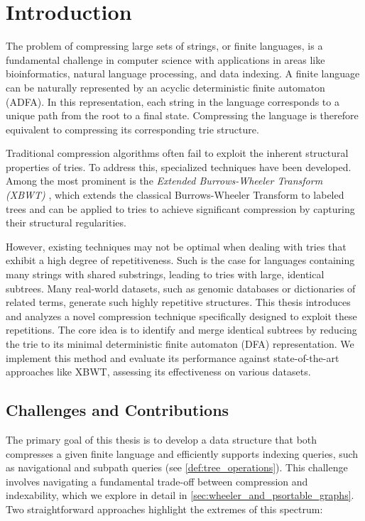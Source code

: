 \chapter{Introduction} \label{chp:introduction}
The problem of compressing large sets of strings, or finite languages, is a fundamental challenge in computer science with applications in areas like bioinformatics, natural language processing, and data indexing. A finite language can be naturally represented by an acyclic deterministic finite automaton (ADFA).  In this representation, each string in the language corresponds to a unique path from the root to a final state. Compressing the language is therefore equivalent to compressing its corresponding trie structure.

Traditional compression algorithms often fail to exploit the inherent structural properties of tries. To address this, specialized techniques have been developed. Among the most prominent is the \textit{Extended Burrows-Wheeler Transform (XBWT)} \cite{ferragina2009compressing}, which extends the classical Burrows-Wheeler Transform \cite{burrows1994block} to labeled trees and can be applied to tries to achieve significant compression by capturing their structural regularities.

However, existing techniques may not be optimal when dealing with tries that exhibit a high degree of repetitiveness. Such is the case for languages containing many strings with shared substrings, leading to tries with large, identical subtrees. Many real-world datasets, such as genomic databases or dictionaries of related terms, generate such highly repetitive structures. This thesis introduces and analyzes a novel compression technique specifically designed to exploit these repetitions. The core idea is to identify and merge identical subtrees by reducing the trie to its minimal deterministic finite automaton (DFA) representation. We implement this method and evaluate its performance against state-of-the-art approaches like XBWT, assessing its effectiveness on various datasets.

\section{Challenges and Contributions}
The primary goal of this thesis is to develop a data structure that both compresses a given finite language and efficiently supports indexing queries, such as navigational and subpath queries (see \cref{def:tree_operations}). This challenge involves navigating a fundamental trade-off between compression and indexability, which we explore in detail in \cref{sec:wheeler_and_psortable_graphs}. Two straightforward approaches highlight the extremes of this spectrum:

